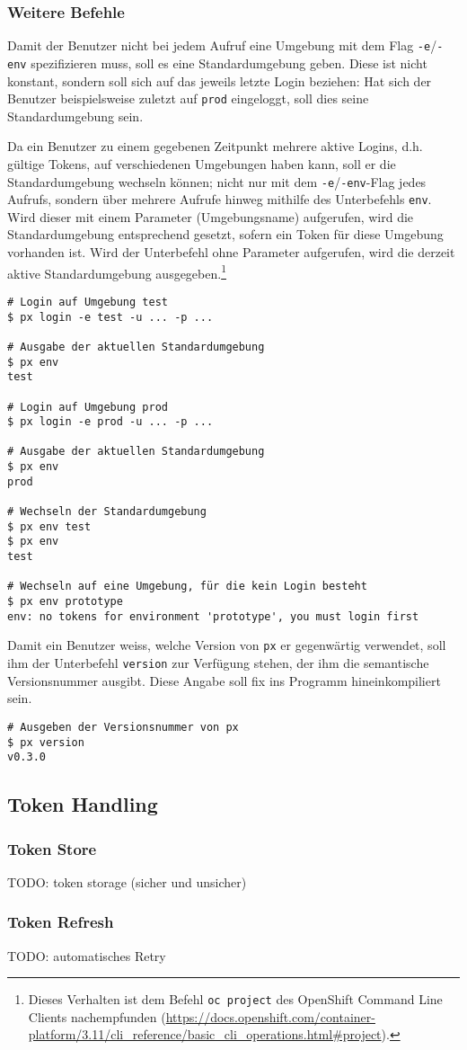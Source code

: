 \subsubsection{Weitere Befehle}

Damit der Benutzer nicht bei jedem Aufruf eine Umgebung mit dem Flag \texttt{-e}/\texttt{-env} spezifizieren muss, soll es eine Standardumgebung geben. Diese ist nicht konstant, sondern soll sich auf das jeweils letzte Login beziehen: Hat sich der Benutzer beispielsweise zuletzt auf \texttt{prod} eingeloggt, soll dies seine Standardumgebung sein.

Da ein Benutzer zu einem gegebenen Zeitpunkt mehrere aktive Logins, d.h. gültige Tokens, auf verschiedenen Umgebungen haben kann, soll er die Standardumgebung wechseln können; nicht nur mit dem \texttt{-e}/\texttt{-env}-Flag jedes Aufrufs, sondern über mehrere Aufrufe hinweg mithilfe des Unterbefehls \texttt{env}. Wird dieser mit einem Parameter (Umgebungsname) aufgerufen, wird die Standardumgebung entsprechend gesetzt, sofern ein Token für diese Umgebung vorhanden ist. Wird der Unterbefehl ohne Parameter aufgerufen, wird die derzeit aktive Standardumgebung ausgegeben.\footnote{Dieses Verhalten ist dem Befehl \texttt{oc project} des OpenShift Command Line Clients nachempfunden (\url{https://docs.openshift.com/container-platform/3.11/cli_reference/basic_cli_operations.html\#project}).}

\begin{lstlisting}[caption={Ausgeben und Wechseln der Standardumgebung}]
# Login auf Umgebung test
$ px login -e test -u ... -p ...

# Ausgabe der aktuellen Standardumgebung
$ px env
test

# Login auf Umgebung prod
$ px login -e prod -u ... -p ...

# Ausgabe der aktuellen Standardumgebung
$ px env
prod

# Wechseln der Standardumgebung
$ px env test
$ px env
test

# Wechseln auf eine Umgebung, für die kein Login besteht
$ px env prototype
env: no tokens for environment 'prototype', you must login first
\end{lstlisting}

Damit ein Benutzer weiss, welche Version von \texttt{px} er gegenwärtig verwendet, soll ihm der Unterbefehl \texttt{version} zur Verfügung stehen, der ihm die semantische Versionsnummer ausgibt. Diese Angabe soll fix ins Programm hineinkompiliert sein.

\begin{lstlisting}[caption={Ausgeben der Versionsnummer}]
# Ausgeben der Versionsnummer von px
$ px version
v0.3.0
\end{lstlisting}

\subsection{Token Handling}
\label{sec:konzept-token-store}

\subsubsection{Token Store}

TODO: token storage (sicher und unsicher)

\subsubsection{Token Refresh}

TODO: automatisches Retry
